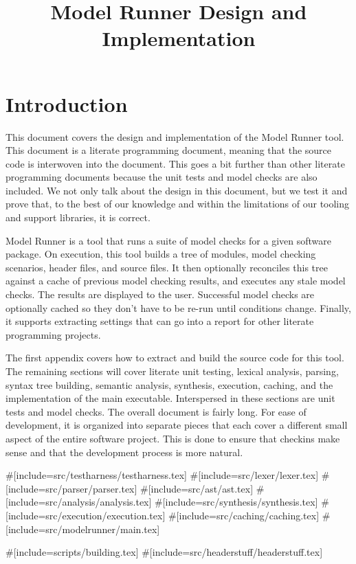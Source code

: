 \title{Model Runner Design and Implementation}

\section{Introduction}

This document covers the design and implementation of the Model Runner tool.
This document is a literate programming document, meaning that the source code
is interwoven into the document. This goes a bit further than other literate
programming documents because the unit tests and model checks are also included.
We not only talk about the design in this document, but we test it and prove
that, to the best of our knowledge and within the limitations of our tooling and
support libraries, it is correct.

Model Runner is a tool that runs a suite of model checks for a given software
package. On execution, this tool builds a tree of modules, model checking
scenarios, header files, and source files. It then optionally reconciles this
tree against a cache of previous model checking results, and executes any stale
model checks.  The results are displayed to the user.  Successful model checks
are optionally cached so they don't have to be re-run until conditions change.
Finally, it supports extracting settings that can go into a report for other
literate programming projects.

The first appendix covers how to extract and build the source code for this
tool.  The remaining sections will cover literate unit testing, lexical
analysis, parsing, syntax tree building, semantic analysis, synthesis,
execution, caching, and the implementation of the main executable.  Interspersed
in these sections are unit tests and model checks.  The overall document is
fairly long.  For ease of development, it is organized into separate pieces that
each cover a different small aspect of the entire software project. This is done
to ensure that checkins make sense and that the development process is more
natural.

#[include=src/testharness/testharness.tex]
#[include=src/lexer/lexer.tex]
#[include=src/parser/parser.tex]
#[include=src/ast/ast.tex]
#[include=src/analysis/analysis.tex]
#[include=src/synthesis/synthesis.tex]
#[include=src/execution/execution.tex]
#[include=src/caching/caching.tex]
#[include=src/modelrunner/main.tex]

\appendix

#[include=scripts/building.tex]
#[include=src/headerstuff/headerstuff.tex]
